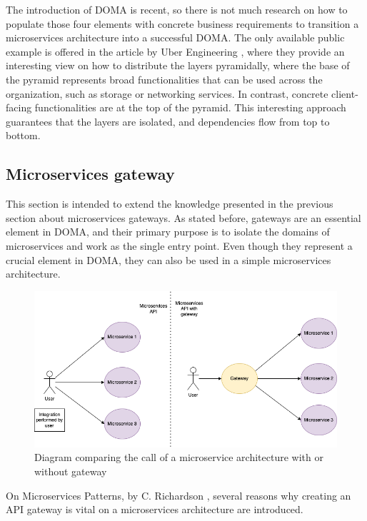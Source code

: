 \documentclass[english, 12pt, a4paper, sci, utf8, a-1b, online]{aaltothesis}
\begin{document}
The introduction of DOMA is recent, so there is not much research on how to populate those four elements with concrete business requirements to transition a microservices architecture into a successful DOMA. The only available public example is offered in the article by Uber Engineering \cite{DOMAUber}, where they provide an interesting view on how to distribute the layers pyramidally, where the base of the pyramid represents broad functionalities that can be used across the organization, such as storage or networking services. In contrast, concrete client-facing functionalities are at the top of the pyramid. This interesting approach guarantees that the layers are isolated, and dependencies flow from top to bottom.

\subsection{Microservices gateway}
\label{sec:microservices-gateway}

This section is intended to extend the knowledge presented in the previous section about microservices gateways. As stated before, gateways are an essential element in DOMA, and their primary purpose is to isolate the domains of microservices and work as the single entry point. Even though they represent a crucial element in DOMA, they can also be used in a simple microservices architecture.\\

\begin{figure}[h!]
    \centering
    \includegraphics[scale=0.3]{src/thesis/img/literature-review/gateway.png}
    \caption{Diagram comparing the call of a microservice architecture with or without gateway}
\end{figure}

On Microservices Patterns, by C. Richardson \cite{richardson2018microservices}, several reasons why creating an API gateway is vital on a microservices architecture are introduced.
\end{document}
